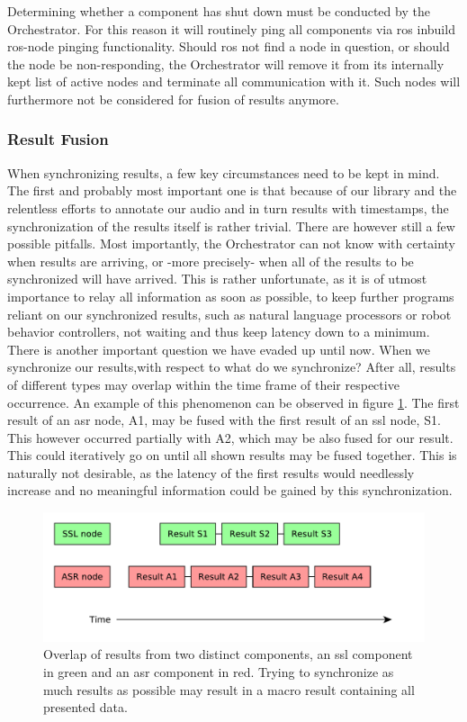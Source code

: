 Determining whether a component has shut down must be conducted by the Orchestrator.
For this reason it will routinely ping all components via \gls{ros} inbuild \gls{ros}-node pinging functionality.
Should \gls{ros} not find a node in question, or should the node be non-responding, the Orchestrator will remove it from its internally kept list of active nodes and terminate all communication with it.
Such nodes will furthermore not be considered for fusion of results anymore. 

\subsubsection{Result Fusion}

When synchronizing results, a few key circumstances need to be kept in mind.
The first and probably most important one is that because of our library and the relentless efforts to annotate our audio and in turn results with timestamps, the synchronization of the results itself is rather trivial.
There are however still a few possible pitfalls.
Most importantly, the Orchestrator can not know with certainty when results are arriving, or -more precisely- when all of the results to be synchronized will have arrived.
This is rather unfortunate, as it is of utmost importance to relay all information as soon as possible, to keep further programs reliant on our synchronized results, such as natural language processors or robot behavior controllers, not waiting and thus keep latency down to a minimum.
There is another important question we have evaded up until now.
When we synchronize our results,with respect to what do we synchronize?
After all, results of different types may overlap within the time frame of their respective occurrence.
An example of this phenomenon can be observed in figure \ref{pic:main:orc:result_overlap}.
The first result of an \gls{asr} node, A1, may be fused with the first result of an \gls{ssl} node, S1.
This however occurred partially with A2, which may be also fused for our result.
This could iteratively go on until all shown results may be fused together.
This is naturally not desirable, as the latency of the first results would needlessly increase and no meaningful information could be gained by this synchronization.

\begin{figure}[]
	\centering
	\includegraphics[width=\textwidth]{diagrams/main_orc_result_overlap.pdf}
	\caption{Overlap of results from two distinct components, an \gls{ssl} component in green and an \gls{asr} component in red.
		Trying to synchronize as much results as possible may result in a macro result containing all presented data.}
	\label{pic:main:orc:result_overlap}
\end{figure}


